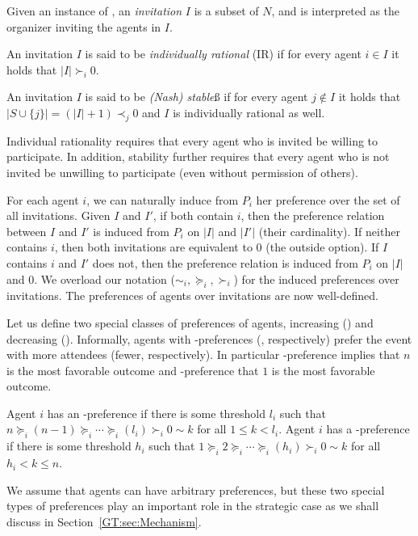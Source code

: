 \begin{definition} \label{GT:def:invitation}
Given an instance of \AOIP, an \emph{invitation} $I$ is a subset of $N$, and is interpreted as the organizer inviting the agents in $I$. 

An invitation $I$ is said to be \emph{individually rational} (IR) if for every agent $i\in I$ it holds that $|I| \succ_i 0$. 

An invitation $I$ is said to be \emph{(Nash) stable}ß if for every agent $j\not\in I$ it holds that $|S \cup \{j\}| = (|I| + 1) \prec_j 0$ and $I$ is individually rational as well.
\end{definition}
Individual rationality requires that every agent who is invited be willing to participate. In addition, stability further requires that every agent who is not invited be unwilling to participate (even without permission of others).

For each agent $i$, we can naturally induce from $P_i$ her preference over the set of all invitations.
Given $I$ and $I'$, if both contain $i$, then the preference relation between $I$ and $I'$ is induced from $P_i$ on $|I|$ and $|I'|$ (their cardinality). If neither contains $i$, then both invitations are equivalent to $0$ (the outside option). If $I$ contains $i$ and $I'$ does not, then the preference relation is induced from $P_i$ on $|I|$ and $0$. 
We overload our notation ($\sim_i, \succeq_i, \succ_i$) for the induced preferences over invitations. 
The preferences of agents over invitations are now well-defined.

Let us define two special classes of preferences of agents, increasing (\INC) and decreasing (\DEC). Informally, agents with \INC-preferences (\DEC, respectively) prefer the event with more attendees (fewer, respectively). In particular \INC-preference implies that $n$ is the most favorable outcome and \DEC-preference that $1$ is the most favorable outcome.
\begin{definition}\label{GT:def:preferenceTypes}
Agent $i$ has an \INC-preference if there is some threshold $l_i$ such that 
$n \succeq_i (n-1) \succeq_i \cdots \succeq_i (l_i) \succ_i 0 \sim k$ for all $1 \leq k < l_i$. 
Agent $i$ has a \DEC-preference if there is some threshold $h_i$ such that 
$1 \succeq_i 2 \succeq_i \cdots \succeq_i (h_i) \succ_i 0 \sim k$ for all $h_i < k \leq n$. 
\end{definition}
We assume that agents can have arbitrary preferences, but these two special types of preferences play an important role in the strategic case as we shall discuss in Section~\ref{GT:sec:Mechanism}. 

